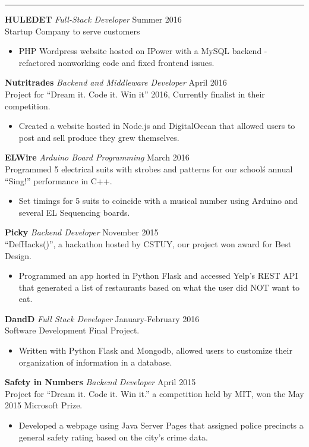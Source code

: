 \documentclass[11pt, letter, sans]{moderncv}
\begin{document}
  \vspace{0.1cm} \hrule \vspace{0.2cm}
  \noindent\textbf{HULEDET}\textit{ Full-Stack Developer} \hfill Summer 2016\\
  Startup Company to serve customers
  \begin{itemize}[label={--},noitemsep, topsep=0pt]
    \item PHP Wordpress website hosted on IPower with a MySQL backend - refactored nonworking code and fixed frontend issues.
  \end{itemize}
  \noindent\textbf{Nutritrades}\textit{ Backend and Middleware Developer} \hfill April 2016\\
  Project for ``Dream it. Code it. Win it'' 2016, Currently finalist in their competition.
  \begin{itemize}[label={--},noitemsep, topsep=0pt]
    \item Created a website hosted in Node.js and DigitalOcean that allowed users to post and sell produce they grew themselves.
  \end{itemize}
  \textbf{ELWire}\textit{ Arduino Board Programming} \hfill March 2016\\
  Programmed 5 electrical suits with strobes and patterns for our school\'s annual ``Sing!'' performance in C++.
  \begin{itemize}[label={--},noitemsep, topsep=0pt]
    \item Set timings for 5 suits to coincide with a musical number using Arduino and several EL Sequencing boards.
  \end{itemize}
  \textbf{Picky}\textit{ Backend Developer} \hfill November 2015\\ ``DefHacks()'', a hackathon hosted by CSTUY, our project won award for Best Design.
  \begin{itemize}[label={--},noitemsep, topsep=0pt]
    \item Programmed an app hosted in Python Flask and accessed Yelp's REST API that generated a list of restaurants based on what the user did NOT want to eat.
  \end{itemize}
  \textbf{DandD}\textit{ Full Stack Developer} \hfill January-February 2016\\
  Software Development Final Project.
  \begin{itemize}[label={--},noitemsep, topsep=0pt]
    \item Written with Python Flask and Mongodb, allowed users to customize their organization of information in a database.
  \end{itemize}
  \noindent\textbf{Safety in Numbers}\textit{ Backend Developer} \hfill April 2015\\
  Project for ``Dream it. Code it. Win it.'' a competition held by MIT, won the May 2015 Microsoft Prize.
  \begin{itemize}[label={--},noitemsep, topsep=0pt]
    \item Developed a webpage using Java Server Pages that assigned police precincts a general safety rating based on the city's crime data.
  \end{itemize}
\end{document}
